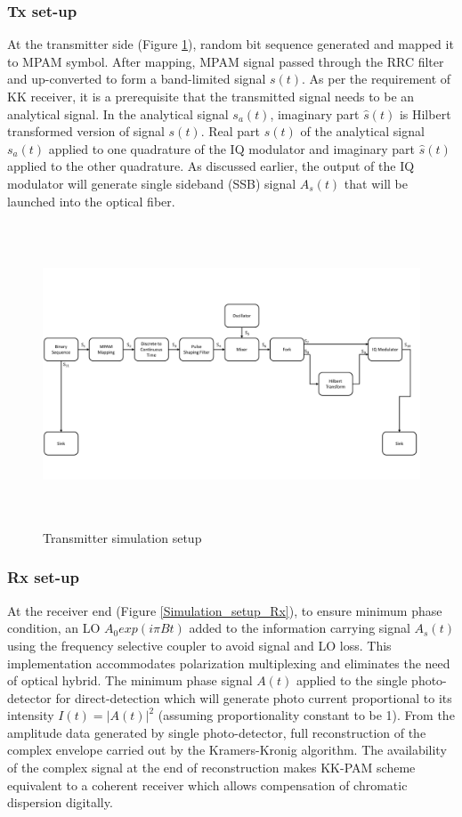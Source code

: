 \subsubsection{Tx set-up}
At the transmitter side (Figure \ref{Simulation_setup_Tx}), random bit sequence generated and mapped it to MPAM symbol. After mapping, MPAM signal passed through the RRC filter and up-converted to form a band-limited signal $s(t)$. As per the requirement of KK receiver, it is a prerequisite that the transmitted signal needs to be an analytical signal. In the analytical signal $s_a(t)$, imaginary part $\hat{s}(t)$ is Hilbert transformed version of signal $s(t)$. Real part  $s(t)$ of the analytical signal  $s_a(t)$ applied to one quadrature of the IQ modulator and imaginary part  $\hat{s}(t)$ applied to the other quadrature. As discussed earlier, the output of the IQ modulator will generate single sideband (SSB) signal $A_s(t)$ that will be launched into the optical fiber.
\begin{figure}[h]
	\centering
	\includegraphics[width=1.0\textwidth, height=9cm]{./sdf/simplified_coherent_receiver/figures/Simulation_setup_Tx.pdf}
	\caption{Transmitter simulation setup}\label{Simulation_setup_Tx}
\end{figure}

\subsubsection{Rx set-up}
At the receiver end (Figure \ref{Simulation_setup_Rx}), to ensure minimum phase condition, an LO $A_0exp(i\pi Bt)$ added to the information carrying signal $A_s(t)$ using the frequency selective coupler to avoid signal and LO loss. This implementation accommodates polarization multiplexing and eliminates the need of optical hybrid. The minimum phase signal $A(t)$ applied to the single photo-detector for direct-detection which will generate photo current proportional to its intensity $I(t)=|A(t)|^2$ (assuming proportionality constant to be 1). From the amplitude data generated by single photo-detector, full reconstruction of the complex envelope carried out by the Kramers-Kronig algorithm. The availability of the complex signal at the end of reconstruction makes KK-PAM scheme equivalent to a coherent receiver which allows compensation of chromatic dispersion digitally. 

